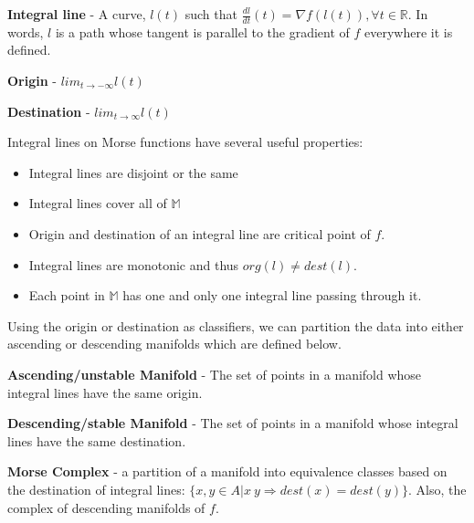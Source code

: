 \begin{defn}
  \textbf{Integral line} - A curve, $l(t)$ such that $\frac{d l}{d t}(t) = \nabla f(l(t)), \forall t \in \mathbb{R}$. In words, $l$ is a path whose tangent is parallel to the gradient of $f$ everywhere it is defined.
\end{defn}

\begin{defn}
  \textbf{Origin} - $lim_{t\rightarrow -\infty}l(t)$
\end{defn}

\begin{defn}
  \textbf{Destination} - $lim_{t\rightarrow \infty}l(t)$
\end{defn}

Integral lines on Morse functions have several useful properties:

\begin{itemize}
\item Integral lines are disjoint or the same
\item Integral lines cover all of $\mathbb{M}$
\item Origin and destination of an integral line are critical point of $f$.
\item Integral lines are monotonic and thus $org(l) \neq dest(l)$.
\item Each point in $\mathbb{M}$ has one and only one integral line passing through it.
\end{itemize}

Using the origin or destination as classifiers, we can partition the data into either ascending or descending manifolds which are defined below.

\begin{defn}
  \textbf{Ascending/unstable Manifold} - The set of points in a manifold whose integral lines have the same origin.
\end{defn}

\begin{defn}
  \textbf{Descending/stable Manifold} - The set of points in a manifold whose integral lines have the same destination.
\end{defn}


\begin{defn}
 \textbf{Morse Complex} - a partition of a manifold into equivalence classes based on the destination of integral lines: $\{x,y \in A | x~y \Rightarrow dest(x) = dest(y)\}$. Also, the complex of descending manifolds of $f$.
\end{defn}

